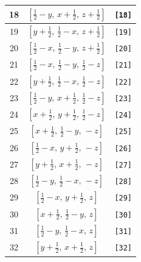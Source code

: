 \documentclass[fleqn,8pt]{jsarticle}
\begin{document}
\begin{longtable}{ccc}
18 & $\left[ \frac{1}{2} - y,\, x + \frac{1}{2},\, z + \frac{1}{2} \right]$ & {\tt [18]} \\ \hline
19 & $\left[ y + \frac{1}{2},\, \frac{1}{2} - x,\, z + \frac{1}{2} \right]$ & {\tt [19]} \\ \hline
20 & $\left[ \frac{1}{2} - x,\, \frac{1}{2} - y,\, z + \frac{1}{2} \right]$ & {\tt [20]} \\ \hline
21 & $\left[ \frac{1}{2} - x,\, \frac{1}{2} - y,\, \frac{1}{2} - z \right]$ & {\tt [21]} \\ \hline
22 & $\left[ y + \frac{1}{2},\, \frac{1}{2} - x,\, \frac{1}{2} - z \right]$ & {\tt [22]} \\ \hline
23 & $\left[ \frac{1}{2} - y,\, x + \frac{1}{2},\, \frac{1}{2} - z \right]$ & {\tt [23]} \\ \hline
24 & $\left[ x + \frac{1}{2},\, y + \frac{1}{2},\, \frac{1}{2} - z \right]$ & {\tt [24]} \\ \hline
25 & $\left[ x + \frac{1}{2},\, \frac{1}{2} - y,\, - z \right]$ & {\tt [25]} \\ \hline
26 & $\left[ \frac{1}{2} - x,\, y + \frac{1}{2},\, - z \right]$ & {\tt [26]} \\ \hline
27 & $\left[ y + \frac{1}{2},\, x + \frac{1}{2},\, - z \right]$ & {\tt [27]} \\ \hline
28 & $\left[ \frac{1}{2} - y,\, \frac{1}{2} - x,\, - z \right]$ & {\tt [28]} \\ \hline
29 & $\left[ \frac{1}{2} - x,\, y + \frac{1}{2},\, z \right]$ & {\tt [29]} \\ \hline
30 & $\left[ x + \frac{1}{2},\, \frac{1}{2} - y,\, z \right]$ & {\tt [30]} \\ \hline
31 & $\left[ \frac{1}{2} - y,\, \frac{1}{2} - x,\, z \right]$ & {\tt [31]} \\ \hline
32 & $\left[ y + \frac{1}{2},\, x + \frac{1}{2},\, z \right]$ & {\tt [32]} \\
\end{longtable}
\end{document}
